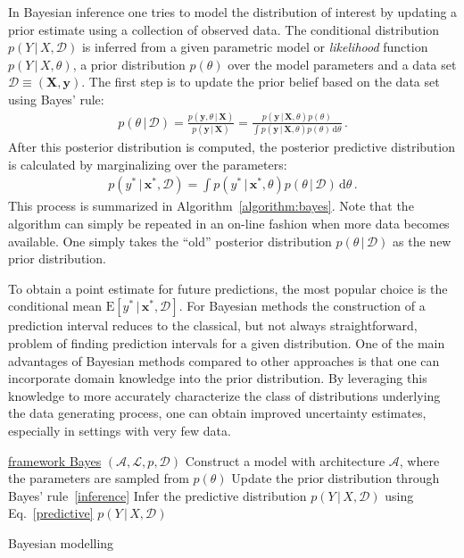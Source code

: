\documentclass[smallcondensed]{svjour3}
\let\oldnl\nl%
\newcommand{\nonl}{\renewcommand{\nl}{\let\nl\oldnl}}%
\newcommand{\intd}{\,\mathrm{d}}
\begin{document}
    In Bayesian inference one tries to model the distribution of interest by updating a prior estimate using a collection of observed data. The conditional distribution $p(Y\,|\,X,\mathcal{D})$ is inferred from a given parametric model or \textit{likelihood} function $p(Y\,|\,X,\theta)$, a prior distribution $p(\theta)$ over the model parameters and a data set $\mathcal{D}\equiv(\mathbf{X},\mathbf{y})$. The first step is to update the prior belief based on the data set using Bayes' rule:
    \begin{gather}
        \label{inference}
        p(\theta\,|\,\mathcal{D}) = \frac{p(\mathbf{y},\theta\,|\,\mathbf{X})}{p(\mathbf{y}\,|\,\mathbf{X})} = \frac{p(\mathbf{y}\,|\,\mathbf{X},\theta)p(\theta)}{\int p(\mathbf{y}\,|\,\mathbf{X}, \theta)p(\theta)\intd\theta}\,.
    \end{gather}
    After this posterior distribution is computed, the posterior predictive distribution is calculated by marginalizing over the parameters:
    \begin{gather}
        \label{predictive}
        p(y^*\,|\,\mathbf{x}^*,\mathcal{D}) = \int p(y^*\,|\,\mathbf{x}^*,\theta)p(\theta\,|\,\mathcal{D})\intd\theta\,.
    \end{gather}
    This process is summarized in Algorithm~\ref{algorithm:bayes}. Note that the algorithm can simply be repeated in an on-line fashion when more data becomes available. One simply takes the ``old'' posterior distribution $p(\theta\,|\,\mathcal{D})$ as the new prior distribution.

    To obtain a point estimate for future predictions, the most popular choice is the conditional mean $\mathrm{E}[y^*\,|\,\mathbf{x}^*, \mathcal{D}]$. For Bayesian methods the construction of a prediction interval reduces to the classical, but not always straightforward, problem of finding prediction intervals for a given distribution. One of the main advantages of Bayesian methods compared to other approaches is that one can incorporate domain knowledge into the prior distribution. By leveraging this knowledge to more accurately characterize the class of distributions underlying the data generating process, one can obtain improved uncertainty estimates, especially in settings with very few data.

    \begin{algorithm}[t!]

        \nonl\underline{framework Bayes} $(\mathcal{A}, \mathcal{L}, p, \mathcal{D})$\;
        Construct a model with architecture $\mathcal{A}$, where the parameters are sampled from $p(\theta)$\;
        Update the prior distribution through Bayes' rule~\eqref{inference}\;
        Infer the predictive distribution $p(Y\,|\, X,\mathcal{D})$ using Eq.~\eqref{predictive}\;
        \KwRet $p(Y\,|\, X,\mathcal{D})$
        \caption{Bayesian modelling}
        \label{algorithm:bayes}
    \end{algorithm}
\end{document}
